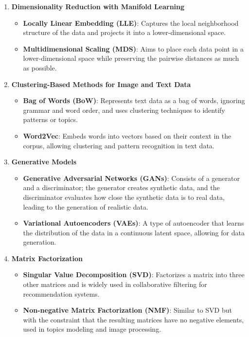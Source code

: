 \documentclass{article}
\begin{document}
\begin{enumerate}
    \item \textbf{Dimensionality Reduction with Manifold Learning}
    \begin{itemize}
        \item \textbf{Locally Linear Embedding (LLE)}: Captures the local neighborhood structure of the data and projects it into a lower-dimensional space.
        \item \textbf{Multidimensional Scaling (MDS)}: Aims to place each data point in a lower-dimensional space while preserving the pairwise distances as much as possible.
    \end{itemize}

    \item \textbf{Clustering-Based Methods for Image and Text Data}
    \begin{itemize}
        \item \textbf{Bag of Words (BoW)}: Represents text data as a bag of words, ignoring grammar and word order, and uses clustering techniques to identify patterns or topics.
        \item \textbf{Word2Vec}: Embeds words into vectors based on their context in the corpus, allowing clustering and pattern recognition in text data.
    \end{itemize}

    \item \textbf{Generative Models}
    \begin{itemize}
        \item \textbf{Generative Adversarial Networks (GANs)}: Consists of a generator and a discriminator; the generator creates synthetic data, and the discriminator evaluates how close the synthetic data is to real data, leading to the generation of realistic data.
        \item \textbf{Variational Autoencoders (VAEs)}: A type of autoencoder that learns the distribution of the data in a continuous latent space, allowing for data generation.
    \end{itemize}

    \item \textbf{Matrix Factorization}
    \begin{itemize}
        \item \textbf{Singular Value Decomposition (SVD)}: Factorizes a matrix into three other matrices and is widely used in collaborative filtering for recommendation systems.
        \item \textbf{Non-negative Matrix Factorization (NMF)}: Similar to SVD but with the constraint that the resulting matrices have no negative elements, used in topics modeling and image processing.
    \end{itemize}
\end{enumerate}
\end{document}
